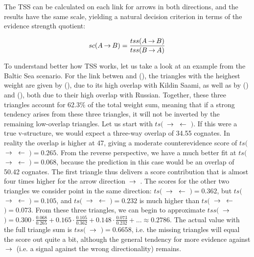 The TSS can be calculated on each link for arrows in both directions, and the results have the same scale, yielding a natural decision criterion in terms of the evidence strength quotient:

\begin{equation*}
 sc(A \kern 2pt\hbox{$\rightarrow$}\kern 2pt B) = \frac{tss(A \kern 2pt\hbox{$\rightarrow$}\kern 2pt B)}{tss(B \kern 2pt\hbox{$\rightarrow$}\kern 2pt A)}
\end{equation*}

\largerpage
To understand better how TSS works, let us take a look at an example from the Baltic Sea scenario. For the link betwen  and  (), the triangles with the heighest weight are given by  (), due to its high overlap with Kildin Saami, as well as by  () and  (), both due to their high overlap with Russian. Together, these three triangles account for $62.3\%$ of the total weight sum, meaning that if a strong tendency arises from these three triangles, it will not be inverted by the remaining low-overlap triangles. Let us start with $ts($ $\kern 2pt\hbox{$\rightarrow$}\kern 2pt$  $\kern 2pt\hbox{$\leftarrow$}\kern 2pt$ $)$. If this were a true v-structure, we would expect a three-way overlap of 34.55 cognates. In reality the overlap is higher at 47, giving a moderate counterevidence score of $ts($ $\kern 2pt\hbox{$\rightarrow$}\kern 2pt$  $\kern 2pt\hbox{$\leftarrow$}\kern 2pt$ $) = 0.265$. From the reverse perspective, we have a much better fit at $ts($ $\kern 2pt\hbox{$\rightarrow$}\kern 2pt$  $\kern 2pt\hbox{$\leftarrow$}\kern 2pt$ $) = 0.068$, because the prediction in this case would be an overlap of 50.42 cognates. The first triangle thus delivers a score contribution that is almost four times higher for the arrow direction  $\kern 2pt\hbox{$\rightarrow$}\kern 2pt$ . The scores for the other two triangles we consider point in the same direction: $ts($ $\kern 2pt\hbox{$\rightarrow$}\kern 2pt$  $\kern 2pt\hbox{$\leftarrow$}\kern 2pt$ $) = 0.362$, but $ts($ $\kern 2pt\hbox{$\rightarrow$}\kern 2pt$  $\kern 2pt\hbox{$\leftarrow$}\kern 2pt$ $) = 0.105$, and $ts($ $\kern 2pt\hbox{$\rightarrow$}\kern 2pt$  $\kern 2pt\hbox{$\leftarrow$}\kern 2pt$ $) = 0.232$ is much higher than $ts($ $\kern 2pt\hbox{$\rightarrow$}\kern 2pt$  $\kern 2pt\hbox{$\leftarrow$}\kern 2pt$ $) = 0.073$. From these three triangles, we can begin to approximate $tss($ $\kern 2pt\hbox{$\rightarrow$}\kern 2pt$ $) = 0.300 \cdot \frac{0.068}{0.265} + 0.165 \cdot \frac{0.105}{0.362} + 0.148 \cdot \frac{0.073}{0.232} + \dots \approx 0.2786$. The actual value with the full triangle sum is $tss($ $\kern 2pt\hbox{$\rightarrow$}\kern 2pt$ $) = 0.6658$, i.e. the missing triangles will equal the score out quite a bit, although the general tendency for more evidence against  $\kern 2pt\hbox{$\rightarrow$}\kern 2pt$  (i.e. a signal against the wrong directionality) remains.

